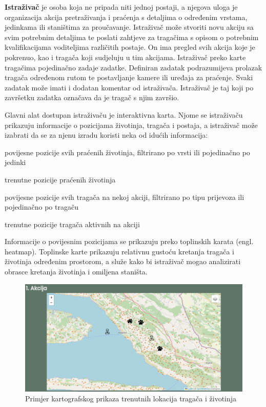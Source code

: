 		\textbf{Istraživač} je osoba koja ne pripada niti jednoj postaji, a njegova uloga je organizacija akcija pretraživanja i praćenja s detaljima o određenim vrstama, jedinkama ili staništima za proučavanje. Istraživač može stvoriti novu akciju sa svim potrebnim detaljima te poslati zahtjeve za tragačima  s opisom o potrebnim kvalifikacijama voditeljima različitih postaje. On ima pregled svih akcija koje je pokrenuo, kao i tragača koji sudjeluju u tim akcijama. Istraživač preko karte tragačima pojedinačno zadaje zadatke. Definiran zadatak podrazumijeva prolazak tragača određenom rutom te postavljanje kamere ili uređaja za praćenje. Svaki zadatak može imati i dodatan komentar od istraživača. Istraživač je taj koji po završetku zadatka označava da je tragač s njim završio.
		
		Glavni alat dostupan istraživaču je interaktivna karta. Njome se istraživaču prikazuju informacije o pozicijama životinja, tragača i postaja, a istraživač može izabrati da se za njenu izradu koristi neka od idućih informacija: 
		
		\begin{packed_item}
			\item povijesne pozicije svih praćenih životinja, filtrirano po vrsti ili pojedinačno po jedinki 
			\item trenutne pozicije praćenih životinja
			\item povijesne pozicije svih tragača na nekoj akciji, filtrirano po tipu prijevoza ili pojedinačno po tragaču 
			\item trenutne pozicije tragača aktivnih na akciji
		\end{packed_item}
		
		Informacije o povijesnim pozicijama se prikazuju preko toplinskih karata (engl. heatmap). Toplinske karte prikazuju relativnu gustoću kretanja tragača i životinja određenim prostorom, a služe kako bi istraživač mogao analizirati obrasce kretanja životinja i omiljena staništa.
		
		\begin{figure}[H]
			\includegraphics[scale=0.7]{slike/map_tracking.PNG} %
			\centering
			\caption{Primjer kartografskog prikaza trenutnih lokacija tragača i životinja}
			\label{fig:promjene}
		\end{figure}
		
